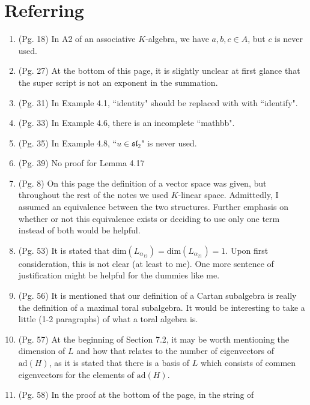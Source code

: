\documentclass[12pt]{article}
\theoremstyle{definition}
\theoremstyle{definition}
\begin{document}
    \section{Referring}
    \begin{enumerate}
        \item (Pg. 18) In A2 of an associative $K$-algebra, we have $a, b, c\in
            A$, but $c$ is never used.
        \item (Pg. 27) At the bottom of this page, it is slightly unclear at
            first glance that the super script is not an exponent in the
            summation.
        \item (Pg. 31) In Example 4.1, ``identity" should be replaced with with
            ``identify".
        \item (Pg. 33) In Example 4.6, there is an incomplete ``mathbb".
        \item (Pg. 35) In Example 4.8, ``$u\in\mathfrak{sl}_2$" is never used.
        \item (Pg. 39) No proof for Lemma 4.17
        \item (Pg. 8) On this page the definition of a vector space was given,
            but throughout the rest of the notes we used $K$-linear space.
            Admittedly, I assumed an equivalence between the two structures.
            Further emphasis on whether or not this equivalence exists or
            deciding to use only one term instead of both would be helpful.
        \item (Pg. 53) It is stated that
            $\text{dim}(L_{\alpha_{12}})=\text{dim}(L_{\alpha_{21}})=1$. Upon
            first consideration, this is not clear (at least to me). One more
            sentence of justification might be helpful for the dummies like me.
        \item (Pg. 56) It is mentioned that our definition of a Cartan
            subalgebra is really the definition of a maximal toral subalgebra.
            It would be interesting to take a little (1-2 paragraphs) of what
            a toral algebra is. 
        \item (Pg. 57) At the beginning of Section 7.2, it may be worth
            mentioning the dimension of $L$ and how that relates to the number
            of eigenvectors of $\text{ad}(H)$, as it is stated that there is
            a basis of $L$ which consists of commen eigenvectors for the
            elements of $\text{ad}(H)$.
        \item (Pg. 58) In the proof at the bottom of the page, in the string of

\end{enumerate}
\end{document}

